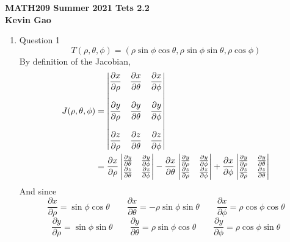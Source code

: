 \documentclass[11pt]{article}
\newcommand{\partialderiv}[2] {\frac{\partial #1}{\partial #2}}
\begin{document}
\begin{center}

{\bf \Large \bf MATH209 Summer 2021 Tets 2.2}\\
{\bf \large Kevin Gao}
\end{center}

\begin{enumerate}
    \item Question 1
    $$
    T(\rho,\theta,\phi) = (\rho \sin\phi \cos\theta, \rho \sin\phi \sin\theta, \rho \cos\phi)
    $$
    By definition of the Jacobian,
    $$
    \begin{aligned}
    J(\rho, \theta, \phi) &= \begin{vmatrix}
    \displaystyle \partialderiv{x}{\rho} & \displaystyle \partialderiv{x}{\theta} & \displaystyle \partialderiv{x}{\phi} \\
    \hfill \\
    \displaystyle \partialderiv{y}{\rho} & \displaystyle \partialderiv{y}{\theta} & \displaystyle \partialderiv{y}{\phi} \\
    \hfill \\
    \displaystyle \partialderiv{z}{\rho} & \displaystyle \partialderiv{z}{\theta} & \displaystyle \partialderiv{z}{\phi}
    \end{vmatrix} \\
    &= \partialderiv{x}{\rho} \begin{vmatrix}
    \partialderiv{y}{\theta} & \partialderiv{y}{\phi} \\
    \partialderiv{z}{\theta} & \partialderiv{z}{\phi}
    \end{vmatrix} - 
    \partialderiv{x}{\theta} \begin{vmatrix}
    \partialderiv{y}{\rho} & \partialderiv{y}{\phi} \\
    \partialderiv{z}{\rho} & \partialderiv{z}{\phi}
    \end{vmatrix} + 
    \partialderiv{x}{\phi} \begin{vmatrix}
    \partialderiv{y}{\rho} & \partialderiv{y}{\theta} \\
    \partialderiv{z}{\rho} & \partialderiv{z}{\theta}
    \end{vmatrix}
    \end{aligned}
    $$
    And since
    $$
    \partialderiv{x}{\rho} = \sin\phi\cos\theta \qquad
    \partialderiv{x}{\theta} = -\rho \sin\phi \sin\theta \qquad \partialderiv{x}{\phi} = \rho\cos\phi\cos\theta
    $$
    $$
    \partialderiv{y}{\rho} = \sin\phi\sin\theta \qquad
    \partialderiv{y}{\theta} = \rho \sin\phi \cos\theta \qquad \partialderiv{y}{\phi} = \rho\cos\phi\sin\theta
$$
\end{enumerate}
\end{document}
